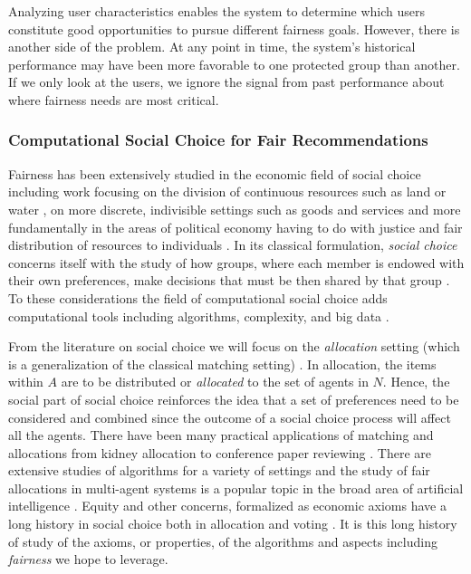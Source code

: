 Analyzing user characteristics enables the system to determine which users constitute good opportunities to pursue different fairness goals. However, there is another side of the problem. At any point in time, the system's historical performance may have been more favorable to one protected group than another. If we only look at the users, we ignore the signal from past performance about where fairness needs are most critical.

\subsubsection{\textbf{Computational Social Choice for Fair Recommendations}}
\hfill

Fairness has been extensively studied in the economic field of social choice including work focusing on the division of continuous resources such as land or water \cite{Moulin:FairDivision}, on more discrete, indivisible settings such as goods and services \cite{Thomson:FairRules,Thomson:IntroFairAllocation} and more fundamentally in the areas of political economy having to do with justice and fair distribution of resources to individuals \cite{Young:Equity,Rawls:Justice,Rescher:Justice}. In its classical formulation, \emph{social choice} concerns itself with the study of how groups, where each member is endowed with their own preferences, make decisions that must be then shared by that group \cite{Sen:CollectiveChoice}. To these considerations the field of computational social choice adds computational tools including algorithms, complexity, and big data \cite{BCELP16a,DBLP:conf/ijcai/Mattei20}.


From the literature on social choice we will focus on the \emph{allocation} setting (which is a generalization of the classical matching setting) \cite{BCELP16a}. In allocation, the items within $A$ are to be distributed or \emph{allocated} to the set of agents in $N$.  Hence, the social part of social choice reinforces the idea that a set of preferences need to be considered and combined since the outcome of a social choice process will affect all the agents.  There have been many practical applications of matching and allocations from kidney allocation \cite{Roth:Kidney} to conference paper reviewing \cite{LiMaNoWa18}.  There are extensive studies of algorithms for a variety of settings \cite{Manlove:MatchingPrefs} and the study of fair allocations in multi-agent systems is a popular topic in the broad area of artificial intelligence \cite{Aziz:FairAllocation}. Equity and other concerns, formalized as economic axioms have a long history in social choice both in allocation \cite{Young:Equity} and voting \cite{Zwicker:Voting}. It is this long history of study of the axioms, or properties, of the algorithms and aspects including \emph{fairness} we hope to leverage.

